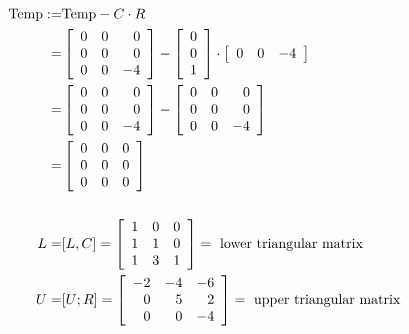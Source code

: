 \begin{align*}
    {\rm Temp} :=& {\rm Temp} - C \cdot R \\
    =& \left[ \begin{array}{rrr} 0 & 0 & 0 \\ 0 & 0 & 0 \\ 0 & 0 & -4 \end{array} \right] 
    - \left[ \begin{array}{r} 0 \\ 0 \\ 1 \end{array} \right] \cdot \left[ \begin{array}{rrr} 0 & 0 & -4 \end{array} \right] \\
    =& \left[ \begin{array}{rrr} 0 & 0 & 0 \\ 0 & 0 & 0 \\ 0 & 0 & -4 \end{array} \right] - \left[ \begin{array}{rrr} 0 & 0 & 0 \\ 0 & 0 & 0 \\ 0 & 0 & -4 \end{array} \right] \\
    =& \left[ \begin{array}{rrr} 0 & 0 & 0 \\ 0 & 0 & 0 \\ 0 & 0 & 0 \end{array} \right] \\
    \\
    L =& [L, C] = \left[ \begin{array}{rrr} 1 & 0 & 0 \\ 1 & 1 & 0 \\ 1 & 3 & 1 \end{array} \right] = ~\textrm{lower triangular matrix} \\
    U =& [U; R] = \left[ \begin{array}{rrr} -2 & -4 & -6 \\ 0 & 5 & 2 \\ 0 & 0 & -4 \end{array} \right] = ~\textrm{upper triangular matrix}
\end{align*}

